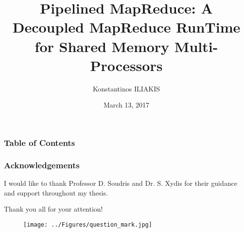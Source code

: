 \documentclass{beamer}
\title[Pipelined MapReduce]{Pipelined MapReduce: A Decoupled MapReduce RunTime for Shared Memory Multi-Processors} %
\author{Konstantinos ILIAKIS} %
\institute[NTUA] %
{
National Technical University of Athens \\ %
\medskip
\textit{iliakiskostis@gmail.com} %

\begin{figure}[h]
	\begin{subfigure}{.3\textwidth}
		\centering
		\texttt{[image: ../Figures/mlab\_logo.jpg]}
	\end{subfigure}
	\hspace{2cm}
	\begin{subfigure}{.15\textwidth}
		\centering
		\texttt{[image: ../Figures/ntua\_logo.jpg]}
	\end{subfigure}
	
	
\end{figure}
}
\date{March 13, 2017} %
\begin{document}
\begin{frame}
\titlepage %
\end{frame}

\begin{frame}
\frametitle{Table of Contents} %
\tableofcontents
\end{frame}








%	


\begin{frame}
	\frametitle{Acknowledgements}
	I would like to thank Professor D. Soudris and Dr. S. Xydis for their guidance and support throughout my thesis.
	\par\vspace{10pt}
	\centerline{Thank you all for your attention!}
	\begin{figure}[h]
		\centering
		\texttt{[image: ../Figures/question\_mark.jpg]}
	\end{figure}
\end{frame}

\end{document}
